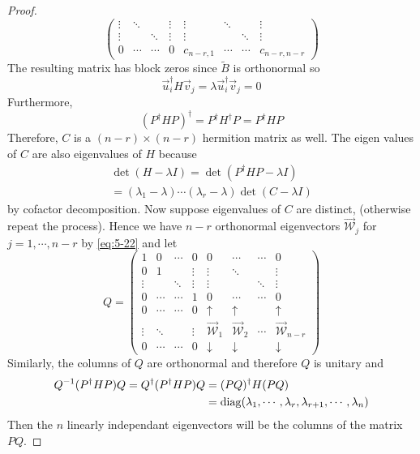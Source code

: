 \documentclass{article}
\numberwithin{equation}{section}
\begin{document}
\begin{proof}
\[\begin{pmatrix}
            \vdots    & \ddots    &        & \vdots    & \vdots     & \ddots &        & \vdots \\
            \vdots    &           & \ddots & \vdots    & \vdots     &        & \ddots & \vdots \\
            0         & \cdots    & \cdots & 0         & c_{n-r, 1} & \cdots & \cdots & c_{n-r, n-r}
        \end{pmatrix}
    \]
    The resulting matrix has block zeros since $\tilde{B}$ is orthonormal so
    \[
        \vec{u}_i^\dagger H \vec v_j = \lambda \vec{u}_i^\dagger \vec v_j = 0
    \]
    Furthermore,
    \[
        (P^\dagger H P)^\dagger = P^\dagger H^\dagger P = P^\dagger H P
    \]
    Therefore, $C$ is a $(n-r) \times (n-r)$ hermition matrix as well.
    The eigen values of $C$ are also eigenvalues of $H$ because
    \begin{align*}
        \det(H - \lambda I) = \det(P^\dagger H P - \lambda I) \\
        = (\lambda_1 - \lambda) \cdots (\lambda_r - \lambda) \det(C - \lambda I)
    \end{align*}
    by cofactor decomposition.
    Now suppose eigenvalues of $C$ are distinct, (otherwise repeat the process).
    Hence we have $n - r$ orthonormal eigenvectors $\vec{\mathcal{W}}_j$ for $j = 1, \cdots, n-r$ by \eqref{eq:5-22} and let
    \[
        Q = \begin{pmatrix}
            1      & 0      & \cdots & 0      & 0                   & \cdots              & \cdots & 0 \\
            0      & 1      &        & \vdots & \vdots              & \ddots              &        & \vdots \\
            \vdots &        & \ddots & \vdots & \vdots              &                     & \ddots & \vdots \\
            0      & \cdots & \cdots & 1      & 0                   & \cdots              & \cdots & 0 \\
            0      & \cdots & \cdots & 0      & \uparrow            & \uparrow            &        & \uparrow \\  
            \vdots & \ddots &        & \vdots & \vec{\mathcal{W}}_1 & \vec{\mathcal{W}}_2 & \cdots & \vec{\mathcal{W}}_{n-r} \\
            0      & \cdots & \cdots & 0      & \downarrow          & \downarrow          &        & \downarrow
        \end{pmatrix}
    \]
    Similarly, the columns of $Q$ are orthonormal and therefore $Q$ is unitary and
    \begin{align*}
        Q^{-1}(P^\dagger H P)Q = Q^\dagger(P^\dagger H P)Q &= (PQ)^\dagger H (PQ) \\
        &= \operatorname{diag}(\lambda_1, \cdots, \lambda_r, \lambda_{r+1}, \cdots, \lambda_n)
    \end{align*}
    Then the $n$ linearly independant eigenvectors will be the columns of the matrix $PQ$.
    

\end{proof}
\end{document}
